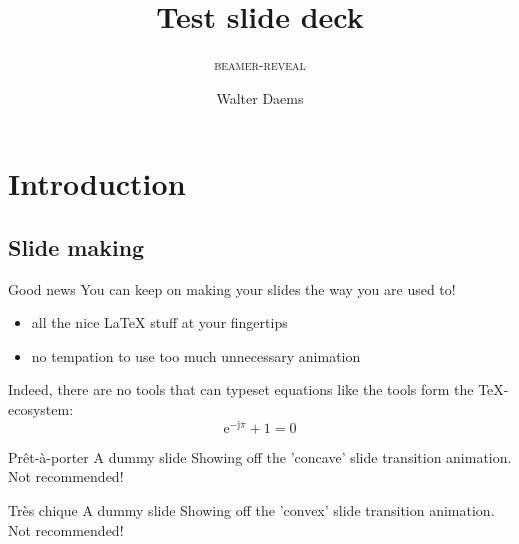\documentclass[11pt,aspectratio=1610,t]{beamer}%
\title{Test slide deck}
\subtitle{\textsc{beamer-reveal}}
\author{Walter Daems}
\newcommand\eu{\mathrm{e}}
\newcommand\ju{\mathrm{j}}
\begin{document}
\begin{frame}[titleslide]
  \titlepage
\end{frame}


\section{Introduction}
\subsection{Slide making}

\begin{frame}
  {Good news}
  {}
  You can keep on making your slides the way you are used to!
  \begin{itemize}
  \item all the nice \LaTeX{} stuff at your fingertips
  \item no tempation to use too much unnecessary animation
  \end{itemize}
  \bigskip

  Indeed, there are no tools that can typeset equations like the tools form the \TeX-ecosystem:
  \begin{equation}
    \eu^{-\ju\pi}+1=0
  \end{equation}

\end{frame}

\begin{frame}[transition=concave,embed,autoslide=2000]
  {Pr\^et-\`a-porter}
  {A dummy slide}
  \vfill
  Showing off the 'concave' slide transition animation. Not recommended!
  \vfill
\end{frame}

\begin{frame}[transition=convex]
  {Très chique}
  {A dummy slide}
  \vfill
  Showing off the 'convex' slide transition animation. Not recommended!
  \vfill
\end{frame}
\end{document}

